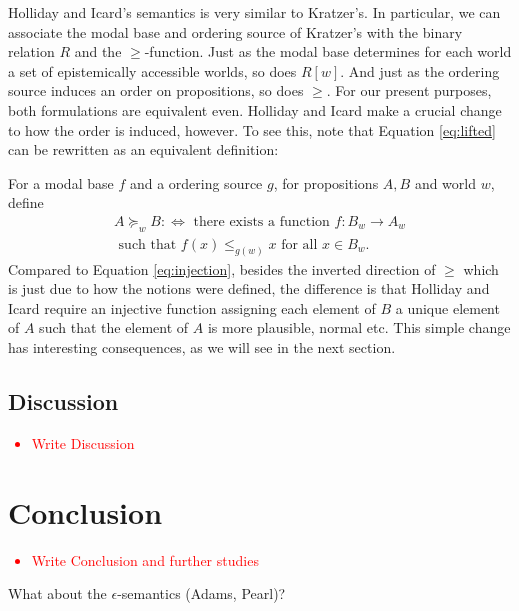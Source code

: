 \documentclass{article}
\theoremstyle{definition}
\newcommand\todo[1]{\textcolor{red}{#1}}
\begin{document}
Holliday and Icard's semantics is very similar to Kratzer's.
In particular, we can associate the modal base and ordering source of Kratzer's with the binary relation $R$ and the $\geq$-function.
Just as the modal base determines for each world a set of epistemically accessible worlds, so does $R[w]$.
And just as the ordering source induces an order on propositions, so does $\geq$.
For our present purposes, both formulations are equivalent even.
Holliday and Icard make a crucial change to how the order is induced, however.
To see this, note that Equation \ref{eq:lifted} can be rewritten as an equivalent definition:

For a modal base $f$ and a ordering source $g$, for propositions $A,B$ and world $w$, define
\begin{multline}
    \tag{2*}
    \label{eq:lifted-star}
    A \succeq_w B :\iff \text{ there exists a function } f: B_w \rightarrow A_w \\ \text{ such that } f(x) \leq_{g(w)} x \text{ for all } x \in B_w.
\end{multline}
Compared to Equation \ref{eq:injection}, besides the inverted direction of $\geq$ which is just due to how the notions were defined, the difference is that Holliday and Icard require an injective function assigning each element of $B$ a unique element of $A$ such that the element of $A$ is more plausible, normal etc. This simple change has interesting consequences, as we will see in the next section. 
\subsection{Discussion}
\todo{
  \begin{itemize}
    \item Write Discussion
  \end{itemize}
}
\section{Conclusion}
\todo{
  \begin{itemize}
    \item Write Conclusion and further studies
  \end{itemize}
}
What about the $\epsilon$-semantics (Adams, Pearl)? 
\nocite{hamblin59_modal_probab,holliday13_measur,harrison-trainor17_prefer,kratzer91_modal,lassiter10_gradab,yalcin10_probab_operat,kratzer98_seman}
 \printbibliography
\end{document}
